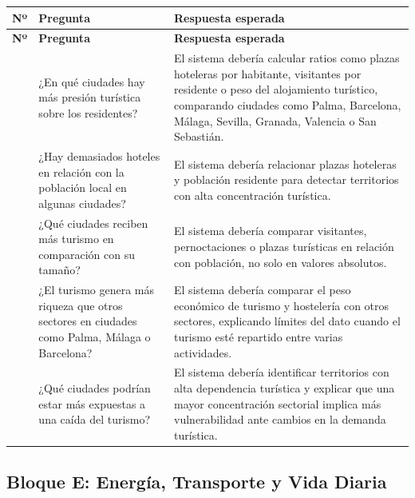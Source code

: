 \begin{longtable}{>{\raggedright\arraybackslash}p{} >{\raggedright\arraybackslash}p{} >{\raggedright\arraybackslash}p{}}
\toprule
\textbf{Nº} & \textbf{Pregunta} & \textbf{Respuesta esperada} \\
\midrule
\endfirsthead
\toprule
\textbf{Nº} & \textbf{Pregunta} & \textbf{Respuesta esperada} \\
\midrule
\endhead
16 & ¿En qué ciudades hay más presión turística sobre los residentes? & El sistema debería calcular ratios como plazas hoteleras por habitante, visitantes por residente o peso del alojamiento turístico, comparando ciudades como Palma, Barcelona, Málaga, Sevilla, Granada, Valencia o San Sebastián. \\
17 & ¿Hay demasiados hoteles en relación con la población local en algunas ciudades? & El sistema debería relacionar plazas hoteleras y población residente para detectar territorios con alta concentración turística. \\
18 & ¿Qué ciudades reciben más turismo en comparación con su tamaño? & El sistema debería comparar visitantes, pernoctaciones o plazas turísticas en relación con población, no solo en valores absolutos. \\
19 & ¿El turismo genera más riqueza que otros sectores en ciudades como Palma, Málaga o Barcelona? & El sistema debería comparar el peso económico de turismo y hostelería con otros sectores, explicando límites del dato cuando el turismo esté repartido entre varias actividades. \\
20 & ¿Qué ciudades podrían estar más expuestas a una caída del turismo? & El sistema debería identificar territorios con alta dependencia turística y explicar que una mayor concentración sectorial implica más vulnerabilidad ante cambios en la demanda turística. \\
\bottomrule
\end{longtable}

\subsection{Bloque E: Energía, Transporte y Vida Diaria}

